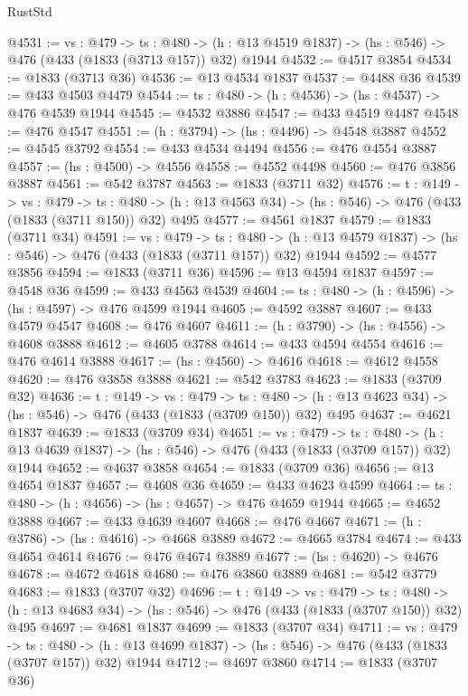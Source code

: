 \begin{lexlean}{RustStd}
\begin{coremodule}
@4531 := {vs : @479} ->
  {ts : @480} -> (h : @13 @4519 @1837) -> (hs : @546) -> @476 (@433 (@1833 (@3713 @157)) @32) @1944
@4532 := @4517 @3854
@4534 := @1833 (@3713 @36)
@4536 := @13 @4534 @1837
@4537 := @4488 @36
@4539 := @433 @4503 @4479
@4544 := {ts : @480} -> (h : @4536) -> (hs : @4537) -> @476 @4539 @1944
@4545 := @4532 @3886
@4547 := @433 @4519 @4487
@4548 := @476 @4547
@4551 := (h : @3794) -> (hs : @4496) -> @4548 @3887
@4552 := @4545 @3792
@4554 := @433 @4534 @4494
@4556 := @476 @4554 @3887
@4557 := (hs : @4500) -> @4556
@4558 := @4552 @4498
@4560 := @476 @3856 @3887
@4561 := @542 @3787
@4563 := @1833 (@3711 @32)
@4576 := {t : @149} ->
  {vs : @479} ->
  {ts : @480} -> (h : @13 @4563 @34) -> (hs : @546) -> @476 (@433 (@1833 (@3711 @150)) @32) @495
@4577 := @4561 @1837
@4579 := @1833 (@3711 @34)
@4591 := {vs : @479} ->
  {ts : @480} -> (h : @13 @4579 @1837) -> (hs : @546) -> @476 (@433 (@1833 (@3711 @157)) @32) @1944
@4592 := @4577 @3856
@4594 := @1833 (@3711 @36)
@4596 := @13 @4594 @1837
@4597 := @4548 @36
@4599 := @433 @4563 @4539
@4604 := {ts : @480} -> (h : @4596) -> (hs : @4597) -> @476 @4599 @1944
@4605 := @4592 @3887
@4607 := @433 @4579 @4547
@4608 := @476 @4607
@4611 := (h : @3790) -> (hs : @4556) -> @4608 @3888
@4612 := @4605 @3788
@4614 := @433 @4594 @4554
@4616 := @476 @4614 @3888
@4617 := (hs : @4560) -> @4616
@4618 := @4612 @4558
@4620 := @476 @3858 @3888
@4621 := @542 @3783
@4623 := @1833 (@3709 @32)
@4636 := {t : @149} ->
  {vs : @479} ->
  {ts : @480} -> (h : @13 @4623 @34) -> (hs : @546) -> @476 (@433 (@1833 (@3709 @150)) @32) @495
@4637 := @4621 @1837
@4639 := @1833 (@3709 @34)
@4651 := {vs : @479} ->
  {ts : @480} -> (h : @13 @4639 @1837) -> (hs : @546) -> @476 (@433 (@1833 (@3709 @157)) @32) @1944
@4652 := @4637 @3858
@4654 := @1833 (@3709 @36)
@4656 := @13 @4654 @1837
@4657 := @4608 @36
@4659 := @433 @4623 @4599
@4664 := {ts : @480} -> (h : @4656) -> (hs : @4657) -> @476 @4659 @1944
@4665 := @4652 @3888
@4667 := @433 @4639 @4607
@4668 := @476 @4667
@4671 := (h : @3786) -> (hs : @4616) -> @4668 @3889
@4672 := @4665 @3784
@4674 := @433 @4654 @4614
@4676 := @476 @4674 @3889
@4677 := (hs : @4620) -> @4676
@4678 := @4672 @4618
@4680 := @476 @3860 @3889
@4681 := @542 @3779
@4683 := @1833 (@3707 @32)
@4696 := {t : @149} ->
  {vs : @479} ->
  {ts : @480} -> (h : @13 @4683 @34) -> (hs : @546) -> @476 (@433 (@1833 (@3707 @150)) @32) @495
@4697 := @4681 @1837
@4699 := @1833 (@3707 @34)
@4711 := {vs : @479} ->
  {ts : @480} -> (h : @13 @4699 @1837) -> (hs : @546) -> @476 (@433 (@1833 (@3707 @157)) @32) @1944
@4712 := @4697 @3860
@4714 := @1833 (@3707 @36)

\end{coremodule}
\end{lexlean}

